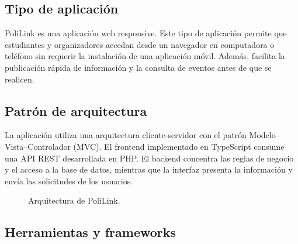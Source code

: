 \documentclass[12pt]{article}
\begin{document}
\subsection{Tipo de aplicación}

PoliLink es una aplicación web responsive. Este tipo de aplicación permite que estudiantes y organizadores accedan desde un navegador en computadora o teléfono sin requerir la instalación de una aplicación móvil. Además, facilita la publicación rápida de información y la consulta de eventos antes de que se realicen.

\subsection{Patrón de arquitectura}

La aplicación utiliza una arquitectura cliente-servidor con el patrón Modelo--Vista--Controlador (MVC). El frontend implementado en TypeScript consume una API REST desarrollada en PHP. El backend concentra las reglas de negocio y el acceso a la base de datos, mientras que la interfaz presenta la información y envía las solicitudes de los usuarios.

\begin{figure}[h!]
\centering
{}
\caption{Arquitectura de PoliLink.}
\end{figure}

\subsection{Herramientas y frameworks}
\end{document}
